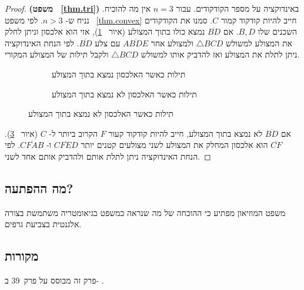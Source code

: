 \begin{proof}\textbf{%
(משפט%
~\ref{thm.tri})}
באינדוקציה על מספר הקודקודים. עבור
$n=3$
אין מה להוכיח. נניח ש-%
$n>3$.
לפי משפט%
~\ref{thm.convex}
חייב להיות קודקוד קמור
$C$.
סמנו את הקודקודים השכנים שלו
$B,D$.
אם
$\overline{BD}$
נמצא כולו בתוך המצולע 
(איור~%
\ref{f.contained}),
אזי הוא אלכסון וניתן לחלק את המצולע למשולש 
$\triangle BCD$
ולמצולע אחר
$\overline{ABDE}$
עם צלע
$\overline{BD}$.
לפי הנחת האינדוקציה ניתן לתלת את המצולע ואז להדביק אותו למשולש
$\triangle BCD$
ולקבל תילות של המצולע המקורי.
\begin{figure}[tb]
\begin{center}
\begin{subfigure}{.4\textwidth}\centering
{}
\caption{תילות כאשר האלכסון נמצא בתוך המצולע}\label{f.contained}
\end{subfigure}
\hspace{3em}
\begin{subfigure}{.4\textwidth}\centering
{}
\caption{תילות כאשר האלכסון לא נמצא בתוך המצולע}\label{f.museum.concave-vertices}
\end{subfigure}
\end{center}
\end{figure}

אם 
$\overline{BD}$
לא נמצא בתוך המצולע, חייב להיות קודקוד קעור
$F$
הקרוב ביותר ל-%
$C$
(איור~%
\ref{f.museum.concave-vertices}).
$\overline{CF}$
הוא אלכסון המחלק את המצולע לשני מצולעים קטנים יותר
$\overline{CFED}$
ו-%
$\overline{CFAB}$.
לפי הנחת האינדוקציה ניתן לתלת אותם ולהדביק אותם אחד לשני.
\end{proof}


\subsection*{מה ההפתעה?}
משפט המוזיאון מפתיע כי ההוכחה של מה שנראה כמשפט בגיאומטריה משתמשת בצורה אלגנטית בצביעת גרפים.

\subsection*{מקורות}

פרק זה מבוסס על פרק~39 ב-%
\cite{thebook}.
